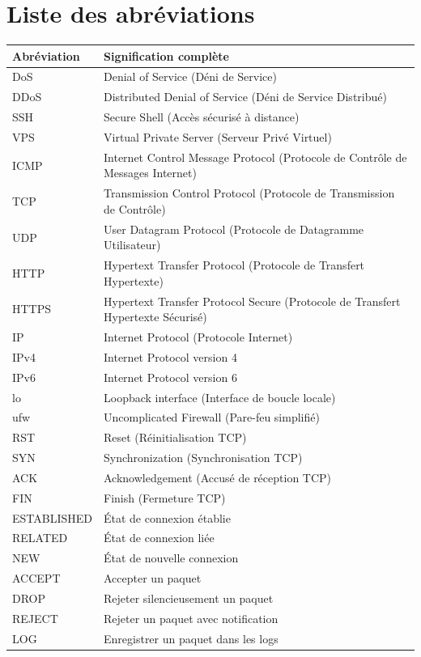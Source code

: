 \chapter*{Liste des abréviations}

\begin{table}[h!]
\centering
\begin{tabular}{p{4cm}p{10cm}}
\toprule
\textbf{Abréviation} & \textbf{Signification complète} \\
\midrule
DoS & Denial of Service (Déni de Service) \\
DDoS & Distributed Denial of Service (Déni de Service Distribué) \\
SSH & Secure Shell (Accès sécurisé à distance) \\
VPS & Virtual Private Server (Serveur Privé Virtuel) \\
ICMP & Internet Control Message Protocol (Protocole de Contrôle de Messages Internet) \\
TCP & Transmission Control Protocol (Protocole de Transmission de Contrôle) \\
UDP & User Datagram Protocol (Protocole de Datagramme Utilisateur) \\
HTTP & Hypertext Transfer Protocol (Protocole de Transfert Hypertexte) \\
HTTPS & Hypertext Transfer Protocol Secure (Protocole de Transfert Hypertexte Sécurisé) \\
IP & Internet Protocol (Protocole Internet) \\
IPv4 & Internet Protocol version 4 \\
IPv6 & Internet Protocol version 6 \\
lo & Loopback interface (Interface de boucle locale) \\
ufw & Uncomplicated Firewall (Pare-feu simplifié) \\
RST & Reset (Réinitialisation TCP) \\
SYN & Synchronization (Synchronisation TCP) \\
ACK & Acknowledgement (Accusé de réception TCP) \\
FIN & Finish (Fermeture TCP) \\
ESTABLISHED & État de connexion établie \\
RELATED & État de connexion liée \\
NEW & État de nouvelle connexion \\
ACCEPT & Accepter un paquet \\
DROP & Rejeter silencieusement un paquet \\
REJECT & Rejeter un paquet avec notification \\
LOG & Enregistrer un paquet dans les logs \\
\bottomrule
\end{tabular}
\end{table}
